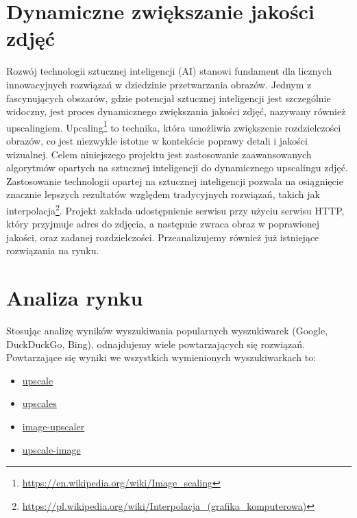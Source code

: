 \chapter{Dynamiczne zwiększanie jakości zdjęć}

Rozwój technologii sztucznej inteligencji (AI) stanowi fundament dla licznych innowacyjnych rozwiązań w dziedzinie przetwarzania obrazów.
Jednym z fascynujących obszarów, gdzie potencjał sztucznej inteligencji jest szczególnie widoczny, jest proces dynamicznego zwiększania jakości zdjęć, nazywany również upscalingiem.
\newline
Upcaling\footnote{\href{https://en.wikipedia.org/wiki/Image\_scaling}{https://en.wikipedia.org/wiki/Image\_scaling}} to technika, która umożliwia zwiększenie rozdzielczości obrazów, co jest niezwykle istotne w kontekście poprawy detali i jakości wizualnej.
\newline
Celem niniejszego projektu jest zastosowanie zaawansowanych algorytmów opartych na sztucznej inteligencji do dynamicznego upscalingu zdjęć.
\newline
Zastosowanie technologii opartej na sztucznej inteligencji pozwala na osiągnięcie znacznie lepszych rezultatów względem tradycyjnych rozwiązań, takich jak interpolacja\footnote{\href{https://pl.wikipedia.org/wiki/Interpolacja\_(grafika\_komputerowa)}{https://pl.wikipedia.org/wiki/Interpolacja\_(grafika\_komputerowa)}}.
\newline
Projekt zakłada udostępnienie serwisu przy użyciu serwisu HTTP, który przyjmuje adres do zdjęcia, a następnie zwraca obraz w poprawionej jakości, oraz zadanej rozdzielczości.
\newline
Przeanalizujemy również już istniejące rozwiązania na rynku.

\chapter{Analiza rynku}

Stosując analizę wyników wyszukiwania popularnych wyszukiwarek (Google, DuckDuckGo, Bing), odnajdujemy wiele powtarzających się rozwiązań.
\newline
Powtarzające się wyniki we wszystkich wymienionych wyszukiwarkach to:
\begin{itemize}
	\item \href{https://www.upscale.media/}{upscale}
	\item \href{https://upscales.ai/}{upscales}
	\item \href{https://www.pixelcut.ai/image-upscaler}{image-upscaler}
	\item \href{https://www.iloveimg.com/upscale-image}{upscale-image}
\end{itemize}

